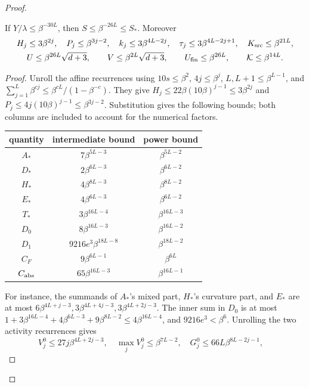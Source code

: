 \begin{proof}
\begin{claim}
\label{cp:src-powers}
If \(Y/\lambda\le\beta^{-30L}\), then \(S\le\beta^{-26L}\le S_*\).
Moreover
\begin{gather}
 H_j\le3\beta^{2j},\quad P_j\le\beta^{3j-2},\quad
 k_j\le3\beta^{4L-2j},\quad\tau_j\le3\beta^{4L-2j+1},
 \quad K_{\rm src}\le\beta^{21L},\label{cp:src-powers-basic}\\
 U\le\beta^{26L}\sqrt{d+3},\qquad
 V\le\beta^{2L}\sqrt{d+3},\qquad
 U_{\rm fin}\le\beta^{26L},\qquad
 \mathcal K\le\beta^{14L}. \label{cp:src-powers-UV}
\end{gather}
\end{claim}
\begin{proof}
Unroll the affine recurrences using \(10s\le\beta^2\),
\(4j\le\beta^j\), \(L,L+1\le\beta^{L-1}\), and
\(\sum_{j=1}^L\beta^{cj}\le\beta^{cL}/(1-\beta^{-c})\).
They give \(H_j\le22\beta(10\beta)^{j-1}\le3\beta^{2j}\)
and \(P_j\le4j(10\beta)^{j-1}\le\beta^{3j-2}\).
Substitution gives the following bounds; both columns are included to
account for the numerical factors.
\begin{center}\small
\begin{tabular}{c|c|c}
quantity& intermediate bound&power bound\\\hline
\(A_*\)&\(7\beta^{5L-3}\)&\(\beta^{5L-2}\)\\
\(D_*\)&\(2\beta^{6L-3}\)&\(\beta^{6L-2}\)\\
\(H_*\)&\(4\beta^{8L-3}\)&\(\beta^{8L-2}\)\\
\(E_*\)&\(4\beta^{6L-3}\)&\(\beta^{6L-2}\)\\
\(T_*\)&\(3\beta^{16L-4}\)&\(\beta^{16L-3}\)\\
\(D_0\)&\(8\beta^{16L-3}\)&\(\beta^{16L-2}\)\\
\(D_1\)&\(9216e^3\beta^{18L-8}\)&\(\beta^{18L-2}\)\\
\(C_F\)&\(9\beta^{6L-1}\)&\(\beta^{6L}\)\\
\(C_{\rm abs}\)&\(65\beta^{16L-3}\)&\(\beta^{16L-1}\)
\end{tabular}\end{center}
For instance, the summands of \(A_*\)'s mixed part, \(H_*\)'s
curvature part, and \(E_*\) are at most
\(6\beta^{4L+j-3},3\beta^{4L+4j-3},3\beta^{4L+2j-3}\).
The inner sum in \(D_0\) is at most
\(1+3\beta^{16L-4}+4\beta^{6L-3}+9\beta^{8L-2}
\le4\beta^{16L-4}\), and \(9216e^3<\beta^6\).
Unrolling the two activity recurrences gives
\[
 V_j^0\le27j\beta^{4L+2j-3},\quad \max_jV_j^0\le\beta^{7L-2},
 \quad G_j^0\le66L\beta^{8L-2j-1},\quad
\]
\end{proof}
\end{proof}
